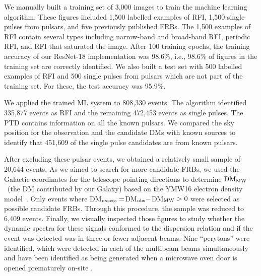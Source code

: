 \documentclass[fleqn,usenatbib]{mnras}
\newcommand{\dmmw}{{\rm DM}_{\rm MW}}
\begin{document}
We manually built a training set of 3,000 images to train the machine learning algorithm. These figures included 1,500 labelled examples of RFI, 1,500 single pulses from pulsars, and five previously published FRBs. %
The 1,500 examples of RFI contain several types including narrow-band and broad-band RFI, periodic RFI, and RFI that saturated the image. %
After 100 training epochs, the training accuracy of our ResNet-18 implementation was 98.6\%, i.e., 98.6\% of figures in the training set are correctly identified. We also built a test set with 500 labelled examples of RFI and 500 single pulses from pulsars which are not part of the training set. For these, the test accuracy was 95.9\%.

We applied the trained ML system to 808,330 events. The algorithm identified 335,877 events as RFI and the remaining 472,453 events as single pulses.
The PTD contains information on all the known pulsars. We compared the sky position for the observation and the candidate DMs with known sources to identify that 451,609 of the single pulse candidates are from known pulsars. 

After excluding these pulsar events, we obtained a relatively small sample of 20,644 events. As we aimed to search for more candidate FRBs, we used the Galactic coordinates for the telescope pointing directions to determine $\dmmw$~(the DM contributed by our Galaxy) based on the YMW16 electron density model~\citep{Yao2017}. 
Only events where DM$_{\rm excess}=$DM$_{\rm obs}-$DM$_{\rm MW}>0$ were selected as possible candidate FRBs. Through this procedure, the sample was reduced to 6,409 events. Finally, we visually inspected those figures to study whether the dynamic spectra for these signals conformed to the dispersion relation and if the event was detected was in three or fewer adjacent beams. Nine ``perytons'' were identified, which were detected in each of the multibeam beams simultaneously and have been identified as being generated when a microwave oven door is opened prematurely on-site \citep[]{perytons}. 
\end{document}
